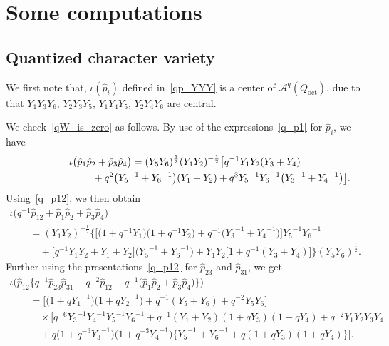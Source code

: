 \documentclass[10pt,a4paper]{amsart}
\numberwithin{equation}{section}
\begin{document}
\appendix

\section{Some computations}

\subsection{Quantized character variety}\label{sec:qW_proof}

We first note that, $\iota(\hat{p}_i)$ defined in~\eqref{qp_YYY} is a center of $\mathcal{A}^q(Q_{\text{oct}})$, due to that $Y_1 Y_3 Y_6$, $Y_2 Y_3 Y_5$, $Y_1 Y_4 Y_5$, $Y_2 Y_4 Y_6$ are central.

We check~\eqref{qW_is_zero} as follows. By use of the expressions~\eqref{q_p1} for $\hat{p}_i$, we have
\begin{gather*}
 \iota \big( \hat{p}_1 \hat{p}_2 + \hat{p}_3 \hat{p}_4 \big) =(Y_5 Y_6 )^{\frac{1}{2}} ( Y_1 Y_2 )^{-\frac{1}{2}} \bigl[ q^{-1} Y_1 Y_2 ( Y_3 + Y_4 ) \\
\hphantom{\iota \big( \hat{p}_1 \hat{p}_2 + \hat{p}_3 \hat{p}_4 \big) =}{} + q^2 \big( {Y_5}^{-1} + {Y_6}^{-1} \big) ( Y_1 + Y_2) + q^3 {Y_5}^{-1} {Y_6}^{-1} \big( {Y_3}^{-1} + {Y_4}^{-1} \big) \bigr] .
\end{gather*}
Using~\eqref{q_p12}, we then obtain
\begin{gather*}
 \iota \big( q^{-1} \hat{p}_{12} + \hat{p}_1 \hat{p}_2 + \hat{p}_3 \hat{p}_4 \big) \\
\qquad{} = ( Y_1 Y_2 )^{-\frac{1}{2}} \big\{ \big[\big( 1 + q^{-1} Y_1\big)\big( 1 + q^{-1} Y_2\big) + q^{-1}\big( {Y_3}^{-1} + {Y_4}^{-1}\big)\big] {Y_5}^{-1} {Y_6}^{-1} \\
 \qquad\quad{} + \big[ q^{-1} Y_1 Y_2 + Y_1 + Y_2\big] \big( {Y_5}^{-1} + {Y_6}^{-1}\big) + Y_1 Y_2 \big[ 1 + q^{-1} ( Y_3 + Y_4 )\big] \big\}( Y_5 Y_6)^{\frac{1}{2}} .
\end{gather*}
Further using the presentations~\eqref{q_p12} for $\hat{p}_{23}$ and $\hat{p}_{31}$, we get
\begin{gather}
\iota \big( \hat{p}_{12}\big\{ q^{-1} \hat{p}_{23} \hat{p}_{31} -q^{-2} \hat{p}_{12} - q^{-1}\big( \hat{p}_1 \hat{p}_2 + \hat{p}_3 \hat{p}_4\big)\big\}\big)\nonumber \\
 \qquad{} = \big[\big( 1 + q {Y_1}^{-1}\big)\big( 1 + q {Y_2}^{-1}\big) + q^{-1} ( Y_5 + Y_6 ) +q^{-2} Y_5 Y_6\big]\nonumber \\
 \qquad\quad{} \times \big[ q^{-6} {Y_3}^{-1} {Y_4}^{-1} {Y_5}^{-1} {Y_6}^{-1} + q^{-1} ( Y_1 +Y_2)( 1 + q Y_3)( 1 + q Y_4) + q^{-2} Y_1 Y_2 Y_3 Y_4\nonumber \\
 \qquad\quad{} + q \big( 1+ q^{-3}{Y_3}^{-1}\big)\big( 1 + q^{-3} {Y_4}^{-1}\big) \big\{ {Y_5}^{-1} + {Y_6}^{-1} + q ( 1 + q Y_3)( 1 + q Y_4)\big\}\big] . \label{qa_1}
 \end{gather}
\end{document}
